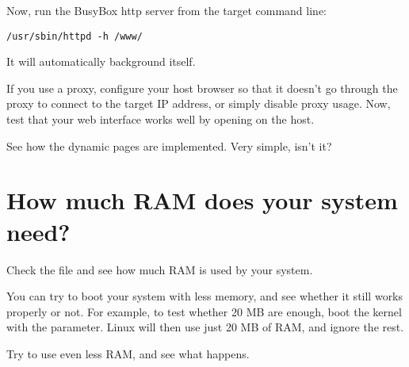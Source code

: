 Now, run the BusyBox http server from the target command line:

\begin{verbatim}
/usr/sbin/httpd -h /www/
\end{verbatim}

It will automatically background itself.

If you use a proxy, configure your host browser so that it doesn't go
through the proxy to connect to the target IP address, or simply
disable proxy usage.  Now, test that your web interface works well by
opening  on the host.

See how the dynamic pages are implemented. Very simple, isn't it?

\section{How much RAM does your system need?}

Check the  file and see how much RAM is used by your
system.

You can try to boot your system with less memory, and see whether it
still works properly or not. For example, to test whether 20 MB are
enough, boot the kernel with the  parameter. Linux will then
use just 20 MB of RAM, and ignore the rest.

Try to use even less RAM, and see what happens.
